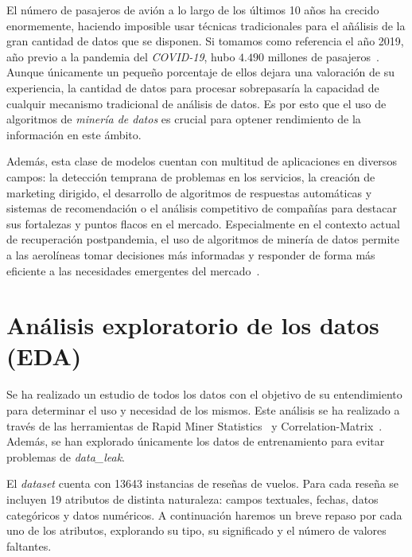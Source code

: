 \documentclass[es]{uc3mreport}
\begin{document}
\begin{report}
El número de pasajeros de avión a lo largo de los últimos 10 años ha crecido enormemente, haciendo imposible usar técnicas tradicionales para el añálisis de la gran cantidad de datos que se disponen. Si tomamos como referencia el año 2019, año previo a la pandemia del \textit{COVID-19}, hubo $4.490$ millones de pasajeros~\cite{owd-passengers}. Aunque únicamente un pequeño porcentaje de ellos dejara una valoración de su experiencia, la cantidad de datos para procesar sobrepasaría la capacidad de cualquir mecanismo tradicional de análisis de datos. Es por esto que el uso de algoritmos de \textit{minería de datos} es crucial para optener rendimiento de la información en este ámbito.

Además, esta clase de modelos cuentan con multitud de aplicaciones en diversos campos: la detección temprana de problemas en los servicios, la creación de marketing dirigido, el desarrollo de algoritmos de respuestas automáticas y sistemas de recomendación o el análisis competitivo de compañías para destacar sus fortalezas y puntos flacos en el mercado. Especialmente en el contexto actual de recuperación postpandemia, el uso de algoritmos de minería de datos permite a las aerolíneas tomar decisiones más informadas y responder de forma más eficiente a las necesidades emergentes del mercado~\cite{espanna}.

\section{Análisis exploratorio de los datos (EDA)}
\label{chap:eda}
Se ha realizado un estudio de todos los datos con el objetivo de su entendimiento para determinar el uso y necesidad de los mismos. Este análisis se ha realizado a través de las herramientas de Rapid Miner Statistics~\cite{Statistics-RM} y Correlation-Matrix~\cite{Correlation-Matrix-RM}. Además, se han explorado únicamente los datos de entrenamiento para evitar problemas de \textit{data\_leak}.

El \textit{dataset} cuenta con 13643 instancias de reseñas de vuelos. Para cada reseña se incluyen 19 atributos de distinta naturaleza: campos textuales, fechas, datos categóricos y datos numéricos. A continuación haremos un breve repaso por cada uno de los atributos, explorando su tipo, su significado y el número de valores faltantes.


\end{report}
\end{document}
